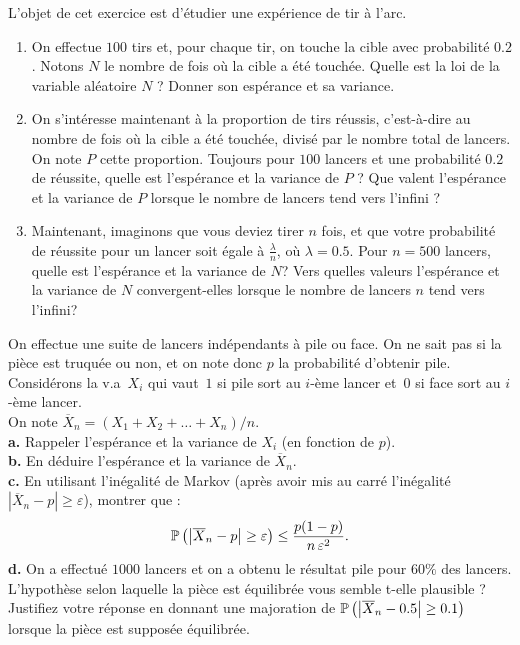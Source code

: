 





\begin{exo} L'objet de cet exercice est d'\'etudier une exp\'erience de tir \`a l'arc.
\begin{enumerate}
\item On effectue $100$ tirs et, pour chaque tir, on touche la cible avec probabilit\'e $0.2$. Notons $N$ le nombre de fois o\`u la cible a \'et\'e touch\'ee. Quelle est la loi de la variable al\'eatoire $N$ ? Donner son esp\'erance et sa variance.
\item On s'int\'eresse maintenant \`a la proportion de tirs r\'eussis, c'est-\`a-dire au nombre de fois o\`u la cible a \'et\'e touch\'ee, divis\'e par le nombre total de lancers. On note $P$ cette proportion. Toujours pour $100$ lancers et une probabilit\'e $0.2$ de r\'eussite, quelle est l'esp\'erance et la variance de $P$ ? Que valent l'esp\'erance et la variance de $P$ lorsque le nombre de lancers tend vers l'infini ?
\item Maintenant, imaginons que vous deviez tirer $n$ fois, et que votre probabilit\'e de r\'eussite pour un lancer soit \'egale \`a $\frac{\lambda}{n}$, o\`u $\lambda = 0.5$. Pour $n = 500$ lancers, quelle est l'esp\'erance et la variance de $N$? Vers quelles valeurs l'esp\'erance et la variance de $N$ convergent-elles lorsque le nombre de lancers $n$ tend vers l'infini?
\end{enumerate}
\end{exo}

\bigskip

\begin{exo} On effectue une suite de lancers indépendants à pile ou face. On ne sait pas si la pièce est truquée ou non, et on note donc $p$ la probabilité d'obtenir pile. \\
Considérons la v.a~$X_i$ qui vaut~$1$ si pile sort au $i$-ème lancer et~$0$ si face sort au $i$-ème lancer. \\
On note $\overline X_n=(X_1+X_2+\ldots+X_n)/n$.\\
\noindent\textbf{a.} Rappeler l'espérance et la variance de $X_i$ (en fonction de $p$).\\
\noindent\textbf{b.} En déduire l'espérance et la variance de $\overline X_n$.\\
\noindent\textbf{c.} En utilisant l'inégalité de Markov (après avoir mis au carré l'inégalité $\left| \overline{X}_n -p \right| \geq \varepsilon$), montrer que :
$$\P \left( \left| \overline{X}_n - p \right| \geq \varepsilon \right)\leq \frac{p(1-p)}{n\,\varepsilon^2}.$$
\noindent\textbf{d.} On a effectué $1 000$ lancers et on a obtenu le résultat pile pour 60$\%$ des lancers. L'hypothèse selon laquelle la pièce est équilibrée vous semble t-elle plausible ? Justifiez votre réponse en donnant une majoration de $\P \left( \left| \overline{X}_n - 0.5 \right| \geq 0.1 \right)$ lorsque la pièce est supposée équilibrée.
\end{exo}

